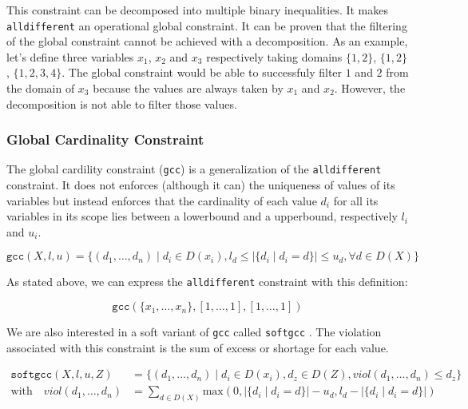 \documentclass[../../thesis.tex]{subfiles}
\begin{document}
This constraint can be decomposed into multiple binary inequalities. It makes \texttt{alldifferent} an operational global constraint.
It can be proven that the filtering of the global constraint cannot be achieved with a decomposition. As 
an example, let's define three variables $x_1$, $x_2$ and $x_3$ respectively taking domains $\{1,2\}$, $\{1,2\}$, $\{1,2,3,4\}$. 
The global constraint would be able to successfuly filter $1$ and $2$ from the domain of 
$x_3$ because the values are always taken by $x_1$ and $x_2$. However, the decomposition is not able to filter those values.


\subsubsection{Global Cardinality Constraint}

The global cardility constraint (\texttt{gcc}) \cite{Regin:1996} is a generalization of the 
\texttt{alldifferent} constraint. It does not enforces (although it can) the uniqueness of values of its variables
but instead enforces that the cardinality of each value $d_i$ for all its variables in its scope lies
between a lowerbound and a upperbound, respectively $l_i$ and $u_i$. 

\begin{equation*}
  \texttt{gcc}(X, l, u) = \{ (d_1, \dots, d_n) \mid d_i \in D(x_i), l_d \leq |\{ d_i \mid d_i = d \}| \leq u_d, \forall d \in D(X) \}
\end{equation*}

As stated above, we can express the \texttt{alldifferent} constraint with this definition:

\begin{equation*}
\texttt{gcc}(\{ x_1, \dots, x_n \}, [1, \dots, 1], [1, \dots, 1])
\end{equation*}


We are also interested in a soft variant of \texttt{gcc} called \texttt{softgcc} \cite{VanHoeve2006}. 
The violation associated with this constraint is the sum of excess or shortage \cite{schaus:softgcc} for each value.

\begin{align*}
  \texttt{softgcc}(X, l, u, Z) &= \{ (d_1, \dots, d_n) \mid d_i \in D(x_i), d_z \in D(Z), viol(d_1, \dots, d_n) \leq d_z \} \\
  \text{with} \quad viol(d_1, \dots, d_n) &= \sum_{d \in D(X)} \text{max}(0, |\{ d_i \mid d_i = d \}| - u_d, l_d - |\{ d_i \mid d_i = d \}|)
\end{align*}
\end{document}
